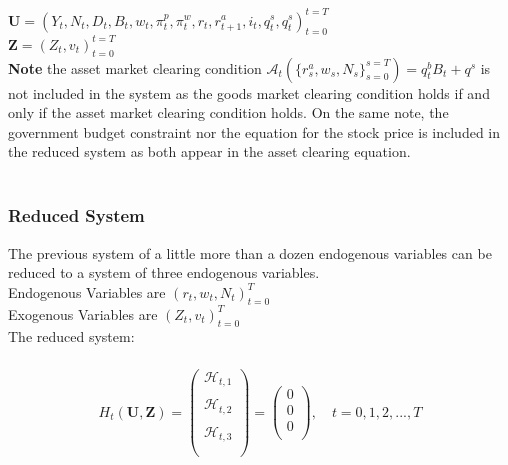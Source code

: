 \documentclass[titlepage]{\econtex}\providecommand{\texname}{BufferStockTheory}
\begin{document}
 
 
 $\mathbf{U} = \left(Y_{t} , N_{t} ,  D_{t
 }, B_{t}, w_{t} , \pi_{t}^{p} ,\pi_{t}^{w}, r_{t} , r_{t+1}^{a}, i_{t} , q_{t}^{s},  q_{t}^{s} \right)_{t=0}^{t=T}$ \\ 

 
 $\mathbf{Z} = \left(Z_{t} ,v_{t}\right)_{t=0}^{t=T}$ \\
 
 \textbf{Note} the asset market clearing condition   $\mathcal{A}_{t}(\{r_{s}^{a} ,w_{s}, N_{s}\}_{s=0}^{s=T}) =  q^{b}_{t}B_{t} + q^{s}$ is not included in the system as the goods market clearing condition holds if and only if the asset market clearing condition holds. On the same note, the government budget constraint nor the equation for the stock price is included in the reduced system as both appear in the asset clearing equation.  \\ \\
 
 
 
\hypertarget{Reduced System}{}
\subsubsection{Reduced System}
 
The previous system of a little more than a dozen endogenous variables can be reduced to a system of three endogenous variables. \\ 
 
Endogenous Variables are $ \left( r_{t} , w_{t} ,N_{t}\right)_{t=0}^{T}$ \\ 
 
Exogenous Variables are $ \left(Z_{t}, v_{t}\right)_{t=0}^{T}$ \\ 

The reduced system: \\ \\

\begin{eqnarray} 
H_{t}(\mathbf{U},\mathbf{Z})= \begin{pmatrix} 
\mathcal{H}_{t,1} \\ \\ 
\mathcal{H}_{t,2} \\ \\
\mathcal{H}_{t,3} \\ \\
 \end{pmatrix} = \begin{pmatrix} 0 \\ 0 \\ 0 \\ \end{pmatrix} , \quad  t = 0, 1, 2, ..., T 
 \end{eqnarray}
 
\end{document}
